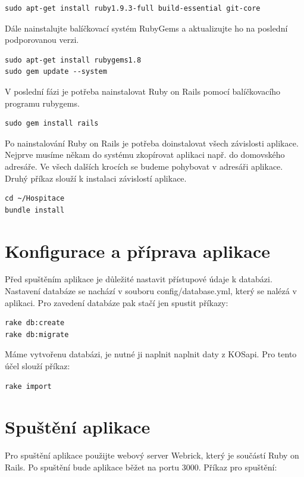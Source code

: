 \begin{verbatim}
sudo apt-get install ruby1.9.3-full build-essential git-core
\end{verbatim}

Dále nainstalujte balíčkovací systém RubyGems a aktualizujte ho na poslední podporovanou verzi.
\begin{verbatim}
sudo apt-get install rubygems1.8
sudo gem update --system
\end{verbatim}

V poslední fázi je potřeba nainstalovat Ruby on Rails pomocí balíčkovacího programu rubygems.

\begin{verbatim}
sudo gem install rails
\end{verbatim}

Po nainstalování Ruby on Rails je potřeba doinstalovat všech závislosti aplikace. Nejprve musíme někam do systému zkopírovat aplikaci např. do domovského adresáře. Ve všech dalších krocích se budeme pohybovat v adresáři aplikace. Druhý příkaz slouží k instalaci závislostí aplikace.

\begin{verbatim}
cd ~/Hospitace
bundle install
\end{verbatim}  

\section{Konfigurace a příprava aplikace}
Před spuštěním aplikace je důležité nastavit přístupové údaje k databázi. Nastavení databáze se nachází v souboru config/database.yml, který se nalézá v aplikaci. Pro zavedení databáze pak stačí jen spustit příkazy:

\begin{verbatim}
rake db:create
rake db:migrate
\end{verbatim}  

Máme vytvořenu databázi, je nutné ji naplnit naplnit daty z KOSapi. Pro tento účel slouží příkaz:

\begin{verbatim}
rake import
\end{verbatim}

\section{Spuštění aplikace}
Pro spuštění aplikace použijte webový server Webrick, který je součástí Ruby on Rails. Po spuštění bude aplikace běžet na portu 3000.
Příkaz pro spuštění:
 

